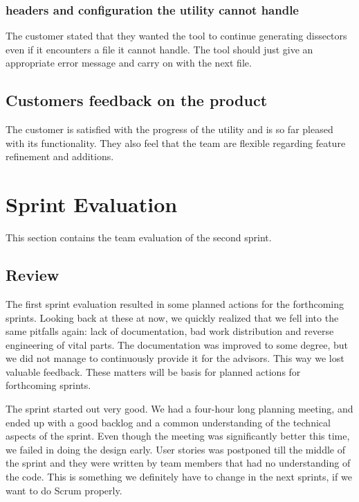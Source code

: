 {{\subsubsection{\Glspl{header} and configuration the \gls{utility} cannot handle}
The customer stated that they wanted the tool to continue generating \glspl{dissector} even if it encounters a file it cannot handle. The tool should just give an appropriate error message and carry on with the next file.

\subsection{Customers feedback on the product}
The customer is satisfied with the progress of the \gls{utility} and is so far pleased with its functionality. They also feel that the team are flexible regarding feature refinement and additions. 

\section{Sprint Evaluation}
\label{sec:sp2:eval}
This section contains the team evaluation of the second sprint.

\subsection{Review}
The first sprint evaluation resulted in some planned actions for the forthcoming sprints. Looking back at these at now, we quickly realized that we fell into the same pitfalls again: lack of documentation, bad work distribution and reverse engineering of vital parts. The documentation was improved to some degree, but we did not manage to continuously provide it for the advisors. This way we lost valuable feedback. These matters will be basis for planned actions for forthcoming sprints. 

The sprint started out very good. We had a four-hour long planning meeting, and ended up with a good backlog and a common understanding of the technical aspects of the sprint. Even though the meeting was significantly better this time, we failed in doing the design early. User stories was postponed till the middle of the sprint and they were written by team members that had no understanding of the code. This is something we definitely have to change in the next sprints, if we want to do Scrum properly.

}}
